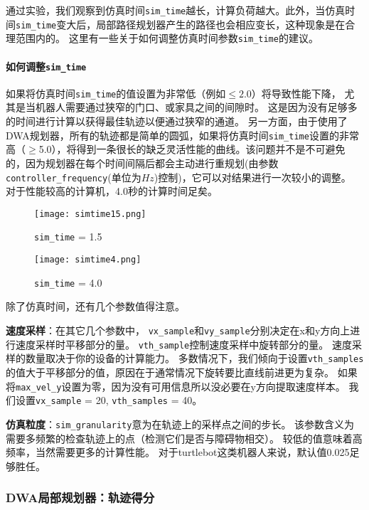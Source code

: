 通过实验，我们观察到仿真时间\texttt{sim_time}越长，计算负荷越大。此外，当仿真时间\texttt{sim_time}变大后，局部路径规划器产生的路径也会相应变长，这种现象是在合理范围内的。
这里有一些关于如何调整仿真时间参数\texttt{sim_time}的建议。

\paragraph[How to tune \texttt{sim\_time}]{如何调整\texttt{sim\_time}}

如果将仿真时间\texttt{sim_time}的值设置为非常低（例如$\leq 2.0$）将导致性能下降，
尤其是当机器人需要通过狭窄的门口、或家具之间的间隙时。
这是因为没有足够多的时间进行计算以获得最佳轨迹以便通过狭窄的通道。
另一方面，由于使用了DWA规划器，所有的轨迹都是简单的圆弧，如果将仿真时间\texttt{sim_time}设置的非常高（$\geq$5.0），将得到一条很长的缺乏灵活性能的曲线。该问题并不是不可避免的，因为规划器在每个时间间隔后都会主动进行重规划(由参数\texttt{controller_frequency}(单位为$Hz$)控制)，它可以对结果进行一次较小的调整。
对于性能较高的计算机，4.0秒的计算时间足矣。


\begin{figure}[!htb]
	\texttt{[image: simtime15.png]}
	\caption{\texttt{sim_time} = 1.5}
	\endminipage\hfill
	\texttt{[image: simtime4.png]}
	\caption{\texttt{sim_time} = 4.0}
	\endminipage\hfill
\end{figure}

除了仿真时间，还有几个参数值得注意。

\textbf{速度采样}：在其它几个参数中，
\texttt{vx_sample}和\texttt{vy_sample}分别决定在x和y方向上进行速度采样时平移部分的量。
\texttt{vth_sample}控制速度采样中旋转部分的量。
速度采样的数量取决于你的设备的计算能力。
多数情况下，我们倾向于设置\texttt{vth_samples}的值大于平移部分的值，原因在于通常情况下旋转要比直线前进更为复杂。
如果将\texttt{max_vel_y}设置为零，因为没有可用信息所以没必要在y方向提取速度样本。
我们设置\texttt{vx_sample} = 20, \texttt{vth_samples} = 40。

\textbf{仿真粒度}：\texttt{sim_granularity}意为在轨迹上的采样点之间的步长。
该参数含义为需要多频繁的检查轨迹上的点（检测它们是否与障碍物相交）。
较低的值意味着高频率，当然需要更多的计算性能。
对于turtlebot这类机器人来说，默认值0.025足够胜任。

\subsubsection[DWA Local Planner: Trajactory Scoring]{DWA局部规划器：轨迹得分}

